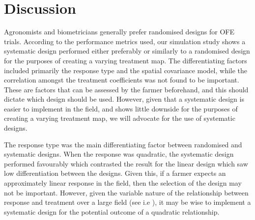 \documentclass[a4paper]{article} 	%
\begin{document}
\section{Discussion}\label{Sec:Dis}

Agronomists and biometricians generally prefer randomised designs for OFE trials. According to the performance metrics used, our simulation study shows a systematic design performed either preferably or similarly to a randomised design for the purposes of creating a varying treatment map. The differentiating factors included primarily the response type and the spatial covariance model, while the correlation amongst the treatment coefficients was not found to be important. These are factors that can be assessed by the farmer beforehand, and this should dictate which design should be used. However, given that a systematic design is easier to implement in the field, and shows little downside for the purposes of creating a varying treatment map, we will advocate for the use of systematic designs. 

The response type was the main differentiating factor between randomised and systematic designs. When the response was quadratic, the systematic design performed favourably which contrasted the result for the linear design which saw low differentiation between the designs. Given this, if a farmer expects an approximately linear response in the field, then the selection of the design may not be important. However, given the variable nature of the relationship between response and treatment over a large field (see i.e \textcite{Rakshit2020Novel}), it may be wise to implement a systematic design for the potential outcome of a quadratic relationship. 
\end{document}

